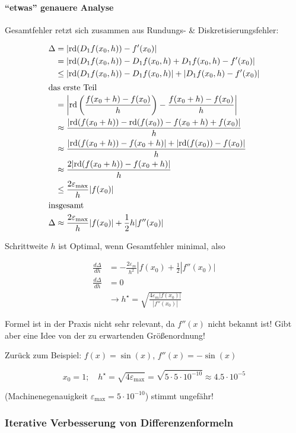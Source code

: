 \documentclass[a4paper,ngerman]{scrbook}
\newcommand{\rd}{\ensuremath{\text{rd}}}%
\begin{document}
\paragraph{"`etwas"' genauere Analyse}

Gesamtfehler retzt sich zusammen aus Rundungs- \& Diskretisierungsfehler:

\begin{align*}
  \Delta &= |\rd(D_1 f(x_0, h)) - f'(x_0)|\\
  &= |\rd(D_1 f(x_0, h)) -D_1 f(x_0, h) + D_1 f(x_0, h) - f'(x_0)|\\
  &\leq |\rd(D_1 f(x_0, h)) -D_1 f(x_0, h)| + |D_1 f(x_0, h) - f'(x_0)|\\
\intertext{das erste Teil}
&= \left|\rd\left( \frac{f(x_0+h) - f(x_0)}{h} \right) - \frac{f(x_0 + h) - f(x_0)}{h}\right|\\
&\approx \frac{|\rd(f(x_0+h)) - \rd(f(x_0)) - f(x_0+h) + f(x_0)|}{h}\\
&\approx \frac{|\rd(f(x_0+h)) - f(x_0+h)| + |\rd(f(x_0))  - f(x_0)|}{h}\\
&\approx \frac{2|\rd(f(x_0+h)) -f(x_0+h)|}{h}\\
&\leq \frac{2\varepsilon_{\max}}{h}|f(x_0)|\\
\intertext{insgesamt}
\Delta &\approx \frac{2\varepsilon_{\max}}{h} |f(x_0)| + \frac{1}{2} h |f''(x_0)|
\end{align*}

Schrittweite $h$ ist Optimal, wenn Gesamtfehler minimal, also

\begin{align*}
\frac{d\Delta}{dh} &= -\frac{2\varepsilon_{m}}{h^2} |     f(x_0) + \frac{1}{2} | f''(x_0)|\\
\frac{d\Delta}{dh} &= 0\\
&\to h^\star = \sqrt{\frac{4\varepsilon_{m} |f(x_0)|}{|f''(x_0)|}}
\end{align*}

Formel ist in der Praxis nicht sehr relevant, da $f''(x)$ nicht bekannt ist! Gibt aber eine Idee von der zu erwartenden Größenordnung!

Zurück zum Beispiel: $f(x) = \sin(x)$, $f''(x) = -\sin(x)$

\[
x_0 = 1;\quad h^\star = \sqrt{4\varepsilon_{\max}} = \sqrt{5\cdot 5\cdot 10^{-10}} \approx 4.5\cdot 10^{-5}
\]

(Machinenegenauigkeit $\varepsilon_{\max} = 5 \cdot 10^{-10}$) stimmt ungefähr!

\subsubsection*{Iterative Verbesserung von Differenzenformeln}
\end{document}
